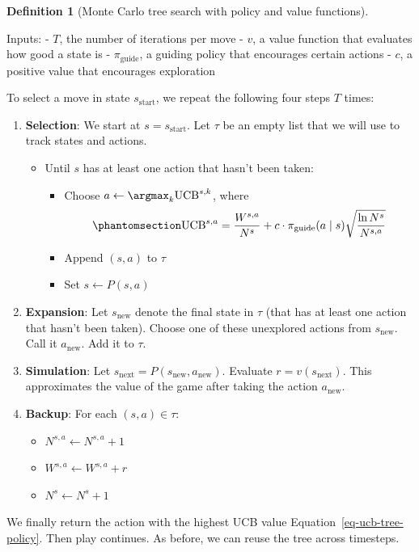 \documentclass[
  letterpaper,
  DIV=11,
  numbers=noendperiod]{scrreprt}
\providecommand{\tightlist}{%
  \setlength{\itemsep}{0pt}\setlength{\parskip}{0pt}}\usepackage{longtable,booktabs,array}
\theoremstyle{plain}
\theoremstyle{plain}
\theoremstyle{definition}
\theoremstyle{definition}
\newtheorem{definition}{Definition}[chapter]
\theoremstyle{remark}
\begin{document}
\begin{definition}[Monte Carlo tree search with policy and value
functions]\protect\hypertarget{def-mcts-policy-value}{}\label{def-mcts-policy-value}

Inputs: - \(T\), the number of iterations per move - \(v\), a value
function that evaluates how good a state is - \(\pi_\text{guide}\), a
guiding policy that encourages certain actions - \(c\), a positive value
that encourages exploration

To select a move in state \(s_\text{start}\), we repeat the following
four steps \(T\) times:

\begin{enumerate}
\def\labelenumi{\arabic{enumi}.}
\tightlist
\item
  \textbf{Selection}: We start at \(s = s_{\text{start}}\). Let \(\tau\)
  be an empty list that we will use to track states and actions.

  \begin{itemize}
  \tightlist
  \item
    Until \(s\) has at least one action that hasn't been taken:

    \begin{itemize}
    \tightlist
    \item
      Choose \(a \gets \argmax_k \text{UCB}^{s, k}\), where
      \begin{equation}\phantomsection\label{eq-ucb-tree-policy}{
      \text{UCB}^{s, a} = \frac{W^{s, a}}{N^s} + c \cdot \pi_\text{guide}(a \mid s) \sqrt{\frac{\ln N^s}{N^{s, a}}}
      }\end{equation}
    \item
      Append \((s, a)\) to \(\tau\)
    \item
      Set \(s \gets P(s, a)\)
    \end{itemize}
  \end{itemize}
\item
  \textbf{Expansion}: Let \(s_\text{new}\) denote the final state in
  \(\tau\) (that has at least one action that hasn't been taken). Choose
  one of these unexplored actions from \(s_\text{new}\). Call it
  \(a_{\text{new}}\). Add it to \(\tau\).
\item
  \textbf{Simulation}: Let
  \(s_\text{next} = P(s_\text{new}, a_\text{new})\). Evaluate
  \(r = v(s_\text{next})\). This approximates the value of the game
  after taking the action \(a_\text{new}\).
\item
  \textbf{Backup}: For each \((s, a) \in \tau\):

  \begin{itemize}
  \tightlist
  \item
    \(N^{s, a} \gets N^{s, a} + 1\)
  \item
    \(W^{s, a} \gets W^{s, a} + r\)
  \item
    \(N^s \gets N^s + 1\)
  \end{itemize}
\end{enumerate}

We finally return the action with the highest UCB value
Equation~\ref{eq-ucb-tree-policy}. Then play continues. As before, we
can reuse the tree across timesteps.

\end{definition}
\end{document}
